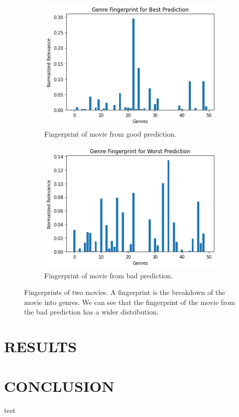 \documentclass[letterpaper, 10 pt, conference]{ieeeconf}  %
\begin{document}
\begin{figure}[h]
   \begin{subfigure}[b]{\columnwidth}
      \includegraphics[width=\linewidth]{./figs/bestfingerprint.png}
      \caption{Fingerprint of movie from good prediction.}
   \end{subfigure}
   \hfill
   \begin{subfigure}[b]{\columnwidth}
      \includegraphics[width=\linewidth]{./figs/worstfingerprint.png}
      \caption{Fingerprint of movie from bad prediction.}
   \end{subfigure}
   \caption{Fingerprints of two movies. A fingerprint is the breakdown of the movie into genres. We can see that the fingerprint of the movie from the bad prediction has a wider distribution.}
\end{figure}
\section{RESULTS}


\section{CONCLUSION}



\begin{thebibliography}{99}
    test


\end{thebibliography}
\end{document}
